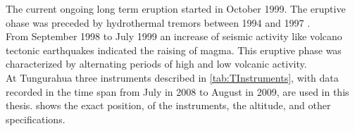 		The current ongoing long term eruption started in October 1999. The eruptive ohase was preceded by hydrothermal tremors between 1994 and 1997 \citep{samaniego2003peligros}.\\
		From September 1998 to July 1999 an increase of seismic activity like volcano tectonic earthquakes indicated the raising of magma. This eruptive phase was characterized by alternating periods of high and low volcanic activity. \\
		
		At Tungurahua three instruments described  in \cref{tab:TInstruments}, with data recorded in the time span from July in 2008 to August in 2009, are used in this thesis.
		 shows the exact position, of the instruments, the altitude, and other specifications. \\
		

